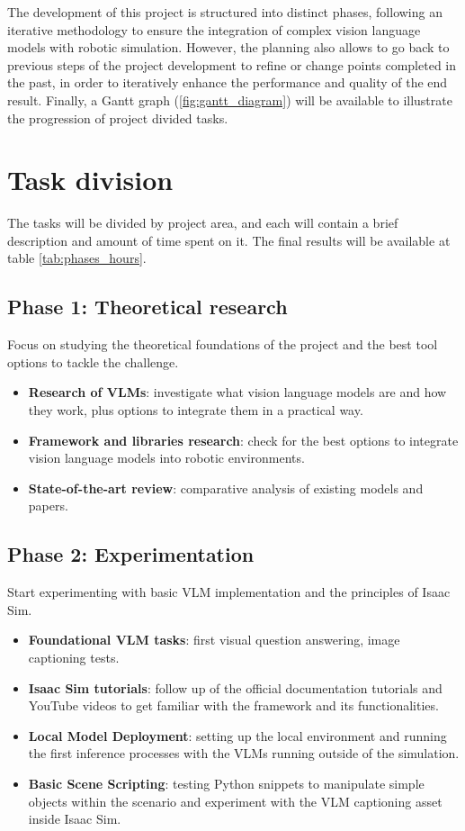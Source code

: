 The development of this project is structured into distinct phases, following an iterative methodology to ensure the integration of complex vision language models with robotic simulation. However, the planning also allows to go back to previous steps of the project development to refine or change points completed in the past, in order to iteratively enhance the performance and quality of the end result. Finally, a Gantt graph (\ref{fig:gantt_diagram}) will be available to illustrate the progression of project divided tasks.

\section{Task division}
The tasks will be divided by project area, and each will contain a brief description and amount of time spent on it. The final results will be available at table \ref{tab:phases_hours}.

\subsection*{Phase 1: Theoretical research}
Focus on studying the theoretical foundations of the project and the best tool options to tackle the challenge.
\begin{itemize}
	\item \textbf{Research of VLMs}: investigate what vision language models are and how they work, plus options to integrate them in a practical way.
	
	\item \textbf{Framework  and libraries research}: check for the best options to integrate vision language models into robotic environments.
	
	\item \textbf{State-of-the-art review}: comparative analysis of existing models and papers.
\end{itemize}

\subsection*{Phase 2: Experimentation}
Start experimenting with basic VLM implementation and the principles of Isaac Sim.
\begin{itemize}
	\item \textbf{Foundational VLM tasks}: first visual question answering, image captioning tests.
	
	\item \textbf{Isaac Sim tutorials}: follow up of the official documentation tutorials and YouTube videos to get familiar with the framework and its functionalities.
	
	\item \textbf{Local Model Deployment}: setting up the local environment and running the first inference processes with the  VLMs running outside of the simulation.
	
	\item \textbf{Basic Scene Scripting}: testing Python snippets to manipulate simple objects within the scenario and experiment with the VLM captioning asset inside Isaac Sim.
\end{itemize}

